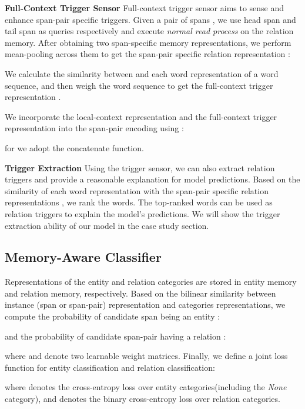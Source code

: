 \documentclass[sigconf]{acmart}
\begin{document}
\noindent\textbf{Full-Context Trigger Sensor}
Full-context trigger sensor aims to sense and enhance span-pair specific triggers. 
Given a pair of spans , we use head span and tail span as queries respectively and execute \textit{normal read process} on the relation memory. After obtaining two span-specific memory representations, we perform mean-pooling across them to get the span-pair specific relation representation :




We calculate the similarity between  and each word representation of a word sequence, and then weigh the word sequence to get the full-context trigger representation .



We incorporate the local-context representation  and the full-context trigger representation  into the span-pair encoding  using :



\noindent for  we adopt the concatenate function.


\noindent\textbf{Trigger Extraction}
Using the trigger sensor, we can also extract relation triggers and provide a reasonable explanation for model predictions. Based on the similarity of each word representation with the span-pair specific relation representations , we rank the words. The top-ranked words can be used as relation triggers to explain the model's predictions. We will show the trigger extraction ability of our model in the case study section. 

\subsection{Memory-Aware Classifier}
\label{sec:ent_classifier}
Representations of the entity and relation categories are stored in entity memory and relation memory, respectively. Based on the bilinear similarity between instance (span or span-pair) representation and categories representations,
we compute the probability of candidate span  being an entity :


\noindent and the probability of candidate span-pair  having a relation :




\noindent where  and  denote two learnable weight matrices. Finally, we define a joint loss function for entity classification and relation classification:


\noindent where  denotes the cross-entropy loss over entity categories(including the \textit{None} category), and  denotes the binary cross-entropy loss over relation categories.
\end{document}
